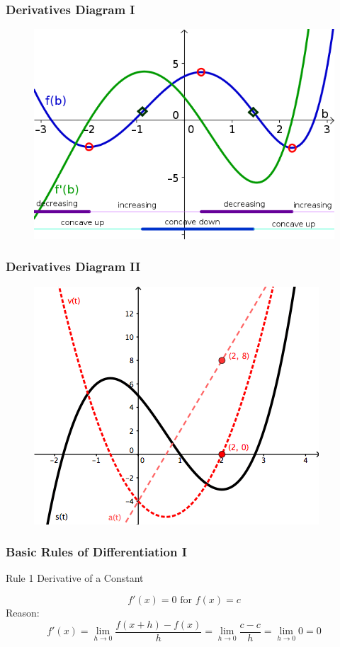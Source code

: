 \documentclass[xcolor=dvipsnames]{beamer}
\begin{document}
\begin{frame}
  \frametitle{Derivatives Diagram I}
  \begin{figure}[h]
    \includegraphics[scale=1.8]{./diagrams/derivs2.png}
  \end{figure}
\end{frame}

\begin{frame}
  \frametitle{Derivatives Diagram II}
  \begin{figure}[h]
    \includegraphics[scale=.6]{./diagrams/derivs1.png}
  \end{figure}
\end{frame}

\begin{frame}
  \frametitle{Basic Rules of Differentiation I}
  \begin{block}{Rule 1}
Derivative of a Constant
  \end{block}
\begin{equation}
  \label{eq:ligoovah}
f'(x)=0\mbox{ for }f(x)=c
\end{equation}
Reason:
\begin{equation}
  \label{eq:ahnieluz}
f'(x)=\lim_{h\rightarrow{}0}\frac{f(x+h)-f(x)}{h}=\lim_{h\rightarrow{}0}\frac{c-c}{h}=\lim_{h\rightarrow{}0}0=0
\end{equation}
\end{frame}
\end{document}
